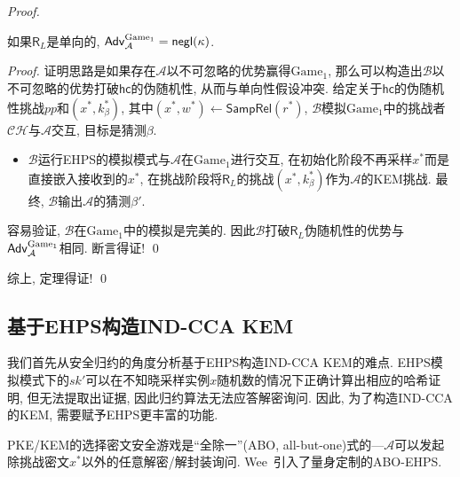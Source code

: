 \begin{proof}
\begin{claim}
如果$\mathsf{R}_L$是单向的, $\mathsf{Adv}_\mathcal{A}^{\text{Game}_1} = \mathsf{negl}(\kappa)$. 
\end{claim}

\begin{proof}
证明思路是如果存在$\mathcal{A}$以不可忽略的优势赢得$\text{Game}_1$, 那么可以构造出$\mathcal{B}$以不可忽略的优势打破$\mathsf{hc}$的伪随机性, 从而与单向性假设冲突. 
给定关于$\mathsf{hc}$的伪随机性挑战$pp$和$(x^*, k_\beta^*)$, 其中$(x^*, w^*) \leftarrow \mathsf{SampRel}(r^*)$, 
$\mathcal{B}$模拟$\text{Game}_1$中的挑战者$\mathcal{CH}$与$\mathcal{A}$交互, 目标是猜测$\beta$. 
\begin{itemize}
\item $\mathcal{B}$运行EHPS的模拟模式与$\mathcal{A}$在$\text{Game}_1$进行交互, 
	在初始化阶段不再采样$x^*$而是直接嵌入接收到的$x^*$, 在挑战阶段将$\mathsf{R}_L$的挑战$(x^*, k_\beta^*)$作为$\mathcal{A}$的KEM挑战. 
    最终, $\mathcal{B}$输出$\mathcal{A}$的猜测$\beta'$. 
\end{itemize} 
容易验证, $\mathcal{B}$在$\text{Game}_1$中的模拟是完美的. 因此$\mathcal{B}$打破$\mathsf{R}_L$伪随机性的优势与$\mathsf{Adv}_\mathcal{A}^{\text{Game}_1}$相同.  
断言得证! \qed
\end{proof}

综上, 定理得证! \qed
\end{proof}


\subsection{基于EHPS构造IND-CCA KEM}
我们首先从安全归约的角度分析基于EHPS构造IND-CCA KEM的难点. 
EHPS模拟模式下的$sk'$可以在不知晓采样实例$x$随机数的情况下正确计算出相应的哈希证明, 但无法提取出证据, 因此归约算法无法应答解密询问.  
因此, 为了构造IND-CCA的KEM, 需要赋予EHPS更丰富的功能. 

PKE/KEM的选择密文安全游戏是``全除一''(ABO, all-but-one)式的—$\mathcal{A}$可以发起除挑战密文$x^*$以外的任意解密/解封装询问. 
Wee~\cite{Wee-CRYPTO-2010}引入了量身定制的ABO-EHPS. 

